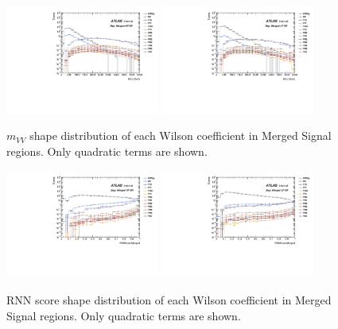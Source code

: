\begin{figure}[ht]
    \centering
    \includegraphics[width=0.45\textwidth]{figures/aQGC/MllJ_SR_HP_aQGC.pdf}
    \includegraphics[width=0.45\textwidth]{figures/aQGC/MllJ_SR_LP_aQGC.pdf}
    \caption{$m_{VV}$ shape distribution of each Wilson coefficient in Merged Signal regions. Only quadratic terms are shown.}
    \label{fig:2lepaQGCshapeMVV}
\end{figure}

\begin{figure}[ht]
    \centering
    \includegraphics[width=0.45\textwidth]{figures/aQGC/RNNScoreMerged_SR_HP_aQGC.pdf}
    \includegraphics[width=0.45\textwidth]{figures/aQGC/RNNScoreMerged_SR_LP_aQGC.pdf}
    \caption{RNN score shape distribution of each Wilson coefficient in Merged Signal regions. Only quadratic terms are shown.}
    \label{fig:2lepaQGCshapeRNN}
\end{figure}

